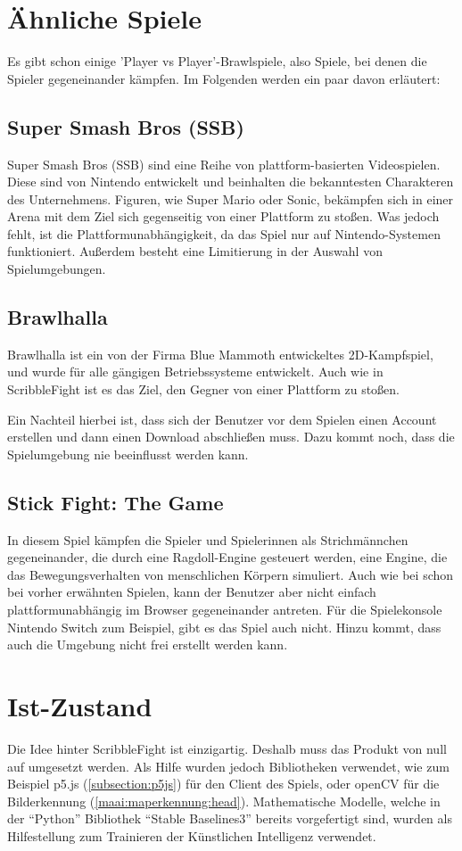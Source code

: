 \section{Ähnliche Spiele}
Es gibt schon einige 'Player vs Player'-Brawlspiele, also Spiele, bei denen die Spieler gegeneinander kämpfen. Im Folgenden werden ein paar davon erläutert:

\subsection{Super Smash Bros (SSB)}
Super Smash Bros (SSB) sind eine Reihe von plattform-basierten Videospielen.
Diese sind von Nintendo entwickelt und beinhalten die bekanntesten Charakteren des Unternehmens.
Figuren, wie Super Mario oder Sonic, bekämpfen sich in einer Arena mit dem Ziel sich gegenseitig
von einer Plattform zu stoßen.
Was jedoch fehlt, ist die Plattformunabhängigkeit, da das Spiel nur auf Nintendo-Systemen funktioniert.
Außerdem besteht eine Limitierung in der Auswahl von Spielumgebungen.

\subsection{Brawlhalla} \cite{brawlhalla}
Brawlhalla ist ein von der Firma Blue Mammoth entwickeltes 2D-Kampfspiel, und wurde für alle gängigen Betriebssysteme entwickelt.
Auch wie in ScribbleFight ist es das Ziel, den Gegner von einer Plattform zu stoßen.

Ein Nachteil hierbei ist, dass sich der Benutzer vor dem Spielen einen Account erstellen
und dann einen Download abschließen muss. Dazu kommt noch, dass die Spielumgebung nie beeinflusst werden kann.

\subsection{Stick Fight: The Game} \cite{stickfight}
In diesem Spiel kämpfen die Spieler und Spielerinnen als Strichmännchen gegeneinander, die durch eine Ragdoll-Engine gesteuert werden, eine Engine, die das Bewegungsverhalten von menschlichen Körpern simuliert.
Auch wie bei schon bei vorher erwähnten Spielen, kann der Benutzer aber nicht einfach plattformunabhängig im Browser gegeneinander antreten.
Für die Spielekonsole Nintendo Switch zum Beispiel, gibt es das Spiel auch nicht. Hinzu kommt, dass auch die Umgebung nicht frei erstellt werden kann.

\section{Ist-Zustand}
Die Idee hinter ScribbleFight ist einzigartig. Deshalb muss das Produkt von null auf umgesetzt werden. Als Hilfe wurden jedoch Bibliotheken verwendet, wie zum Beispiel p5.js (\ref{subsection:p5js}) für den Client des Spiels, oder openCV für die Bilderkennung (\ref{maai:maperkennung:head}).
Mathematische Modelle, welche in der ``Python'' Bibliothek ``Stable Baselines3'' bereits vorgefertigt sind, wurden
als Hilfestellung zum Trainieren der Künstlichen Intelligenz verwendet.